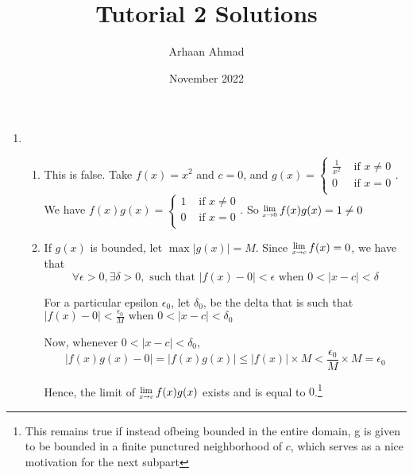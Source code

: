 \documentclass{article}
\title{Tutorial 2 Solutions}
\author{Arhaan Ahmad}
\date{November 2022}
\newcommand{\Lim}[1]{\raisebox{0.5ex}{\scalebox{0.8}{$\displaystyle \lim_{#1}\;$}}}
\begin{document}
        \maketitle
        \begin{enumerate}
                \item 
                        \begin{enumerate}
                        \item This is false. Take $f(x) = x^2$ and $c=0$, and 
                                $g(x) = \begin{cases}
                                        \frac{1}{x^2} & \text{ if } x \neq 0\\
                                        0 & \text{ if } x = 0\\
                                \end{cases}$. 
                                We have 
                                $f(x)g(x) = \begin{cases}
                                        1 & \text{ if } x \neq 0\\
                                        0 & \text{ if } x = 0\\
                                \end{cases}$. 
                                So $\Lim{x\to 0} f(x)g(x) = 1 \neq 0$
                         \item If $g(x)$ is bounded, let $\max |g(x)| = M$. 
                                 Since $\Lim{x\to c} f(x) = 0$, we have that 
                                 $$\forall \epsilon > 0, \exists \delta > 0, \text{ such that } |f(x) - 0 | < \epsilon \text{ when } 0 < |x-c| < \delta$$


                                 For a particular epsilon $\epsilon_0$, let $\delta_0$, be the delta that is such that 
                                 $|f(x) - 0 | < \frac{\epsilon_0}{M} \text{ when } 0 < |x-c| < \delta_0$

                                 Now, whenever $0 < |x-c| < \delta_0$, 
                                 $$|f(x)g(x) - 0| = |f(x)g(x)| \leq |f(x)| \times M < \frac{\epsilon_0}{M} \times M = \epsilon_0$$
                                 
                                 Hence, the limit of $\Lim{x\to c}f(x)g(x)$ exists and is equal to $0$.\footnote{This remains true if instead ofbeing bounded in the entire domain, g is given to be bounded in a finite punctured neighborhood of $c$, which serves as a nice motivation for the next subpart} 
 

\end{enumerate}
\end{enumerate}
\end{document}
